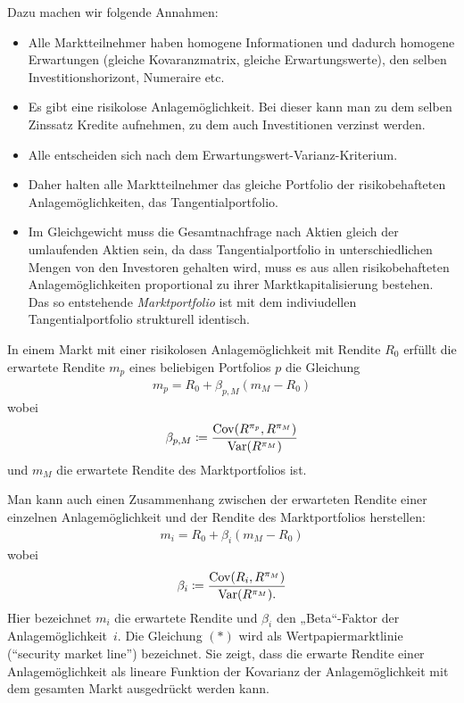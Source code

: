 \documentclass[a4paper,twoside,DIV15,BCOR12mm]{scrbook}
\DeclareMathOperator{\Var}{Var}
\DeclareMathOperator{\Cov}{Cov}
\begin{document}
Dazu machen wir folgende Annahmen:
\begin{itemize}
\item Alle Marktteilnehmer haben homogene Informationen und dadurch homogene Erwartungen (gleiche Kovaranzmatrix, gleiche Erwartungswerte), den selben Investitionshorizont, Numeraire etc.
\item Es gibt eine risikolose Anlagemöglichkeit. Bei dieser kann man zu dem selben Zinssatz Kredite aufnehmen, zu dem auch Investitionen verzinst werden.
\item Alle entscheiden sich nach dem Erwartungswert-Varianz-Kriterium.
\item Daher halten alle Marktteilnehmer das gleiche Portfolio der risikobehafteten Anlagemöglichkeiten, das Tangentialportfolio.
\item Im Gleichgewicht muss die Gesamtnachfrage nach Aktien gleich der umlaufenden Aktien sein, da dass Tangentialportfolio in unterschiedlichen Mengen von den Investoren gehalten wird, muss es aus allen risikobehafteten Anlagemöglichkeiten proportional zu ihrer Marktkapitalisierung bestehen. Das so entstehende \emph{Marktportfolio} ist mit dem indiviudellen Tangentialportfolio strukturell identisch.
\end{itemize}

\begin{satz}
In einem Markt mit einer risikolosen Anlagemöglichkeit mit Rendite $R_0$ erfüllt die erwartete Rendite $m_p$ eines beliebigen Portfolios $p$ die Gleichung 
\begin{align*}
m_p = R_0 + \beta_{p,M}(m_M-R_0)
\end{align*}
wobei 
\begin{align*}
\beta_{p,M} \da \frac{\Cov(R^{\pi_p}, R^{\pi_M})}{\Var(R^{\pi_M})}
\end{align*}
und $m_M$ die erwartete Rendite des Marktportfolios ist.
\end{satz}

Man kann auch einen Zusammenhang zwischen der erwarteten Rendite einer einzelnen Anlagemöglichkeit und der Rendite des Marktportfolios herstellen:
\begin{align*}
m_i = R_0 + \beta_i(m_M - R_0) \tag{$*$}
\end{align*}
wobei
\[
\beta_i \da \frac{\Cov(R_i,R^{\pi_M})}{\Var(R^{\pi_M}).}
\]
Hier bezeichnet $m_i$ die erwartete Rendite und $\beta_i$ den „Beta“-Faktor der Anlagemöglichkeit~$i$.  Die Gleichung $(*)$ wird als Wertpapiermarktlinie (“security market line”) bezeichnet. Sie zeigt, dass die erwarte Rendite einer Anlagemöglichkeit als lineare Funktion der Kovarianz der Anlagemöglichkeit mit dem gesamten Markt ausgedrückt werden kann.
\end{document}

